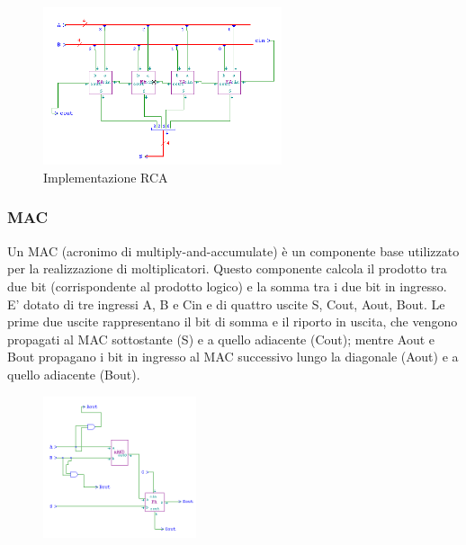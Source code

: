 \documentclass[10pt]{article}
\begin{document}
\begin{itemize}
\begin{figure}[H]
    \begin{minipage}[c]{\textwidth} 
    \centering   
    \includegraphics[width=70mm]{RCA}
    \caption{Implementazione RCA}
    \label{ }
    \end{minipage}
\end{figure}

\subsubsection{MAC}
Un MAC (acronimo di multiply-and-accumulate) è un componente base utilizzato per la realizzazione di moltiplicatori. Questo componente calcola il prodotto tra due bit (corrispondente al prodotto logico)
e la somma tra i due bit in ingresso. E' dotato di tre ingressi A, B e Cin e di quattro uscite S, Cout, Aout, Bout. Le prime due uscite rappresentano il bit di somma e il riporto in uscita,
che vengono propagati al MAC sottostante (S) e a quello adiacente (Cout); mentre Aout e Bout propagano i bit in ingresso al MAC successivo lungo la diagonale (Aout) e a quello adiacente (Bout).
\begin{figure}[H]
    \centering
    \includegraphics[width=0.4\textwidth]{MAC}
\end{figure}


\end{itemize}
\end{document}
